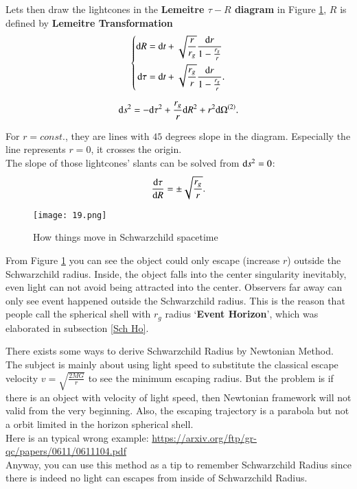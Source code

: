 \documentclass[openany,10pt]{book}
\theoremstyle{definition}
\theoremstyle{definition}
\theoremstyle{remark}
\begin{document}
Lets then draw the lightcones in the \textbf{Lemeitre $\tau-R$ diagram} in Figure \ref{Sch diagram},  $R$ is defined by \textbf{Lemeitre Transformation}
\begin{equation}
\left\{\begin{aligned}
     {\rm d}R&={\rm d}t+\sqrt{\frac{r}{r_g}}\frac{{\rm d}r}{1-\frac{r_g}{r}}\\
     {\rm d}\tau&={\rm d}t+\sqrt{\frac{r_g}{r}}\frac{{\rm d}r}{1-\frac{r_g}{r}}.
\end{aligned}\right.
\end{equation}

\begin{equation}
    {\rm d}s^2=-{\rm d}\tau^2+\frac{r_g}{r}{\rm d}R^2+r^2{\rm d}\Omega^{(2)}.
\end{equation}

For $r=const.$, they are lines with $45$ degrees slope in the diagram. Especially the line represents $r=0$, it crosses the origin.\\ 
The slope of those lightcones' slants can be solved from ${\rm d}s^2=0$:
\begin{equation}
    \frac{{\rm d}\tau}{{\rm d}R}=\pm \sqrt{\frac{r_g}{r}}.
\end{equation}

\begin{figure}[htbp]
    \centering
    \texttt{[image: 19.png]}
    \caption{How things move in Schwarzchild spacetime}
    \label{Sch diagram}
\end{figure}

From Figure \ref{Sch diagram} you can see the object could only escape (increase $r$) outside the Schwarzchild radius. Inside, the object falls into the center singularity inevitably, even light can not avoid being attracted into the center. Observers far away can only see event happened outside the Schwarzchild radius. This is the reason that people call the spherical shell with $r_g$ radius `{\bfseries Event Horizon}', which was elaborated in subsection \ref{Sch Ho}.

\hrulefill

\rem

There exists some ways to derive Schwarzchild Radius by Newtonian Method. The subject is mainly about using light speed to substitute the classical escape velocity $v=\sqrt{\frac{2MG}{r}}$ to see the minimum escaping radius. But the problem is if there is an object with velocity of light speed, then Newtonian framework will not valid from the very beginning. Also, the escaping trajectory is a parabola but not a orbit limited in the horizon spherical shell. \\
Here is an typical wrong example: \url{https://arxiv.org/ftp/gr-qc/papers/0611/0611104.pdf}\\
Anyway, you can use this method as a tip to remember Schwarzchild Radius since there is indeed no light can escapes from inside of Schwarzchild Radius. 
\end{document}
